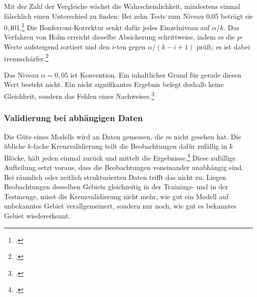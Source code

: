 \documentclass[12pt,a4paper]{article}
\begin{document}
Mit der Zahl der Vergleiche wächst die Wahrscheinlichkeit, mindestens einmal fälschlich einen
Unterschied zu finden: Bei zehn Tests zum Niveau 0,05 beträgt sie 0,401.\footcite[435]{Fahrmeir2023}
Die Bonferroni-Korrektur senkt dafür jedes Einzelniveau auf $\alpha/k$. Das Verfahren von Holm
erreicht dieselbe Absicherung schrittweise, indem es die $p$-Werte aufsteigend sortiert und den
$i$-ten gegen $\alpha/(k-i+1)$ prüft; es ist dabei trennschärfer.\footcite[12-13]{Demsar2006}

Das Niveau $\alpha = 0{,}05$ ist Konvention. Ein inhaltlicher Grund für gerade diesen Wert besteht
nicht. Ein nicht signifikantes Ergebnis belegt deshalb keine Gleichheit, sondern das Fehlen eines
Nachweises.\footcite[485]{Altman1995}

\subsubsection{Validierung bei abhängigen Daten}

Die Güte eines Modells wird an Daten gemessen, die es nicht gesehen hat. Die übliche $k$-fache
Kreuzvalidierung teilt die Beobachtungen dafür zufällig in $k$ Blöcke, hält jeden einmal zurück und
mittelt die Ergebnisse.\footcite[201-208]{James2023} Diese zufällige Aufteilung setzt voraus, dass die
Beobachtungen voneinander unabhängig sind. Bei räumlich oder zeitlich strukturierten Daten trifft das
nicht zu. Liegen Beobachtungen desselben Gebiets gleichzeitig in der Trainings- und in der Testmenge,
misst die Kreuzvalidierung nicht mehr, wie gut ein Modell auf unbekanntes Gebiet verallgemeinert,
sondern nur noch, wie gut es bekanntes Gebiet wiedererkennt.
\end{document}
